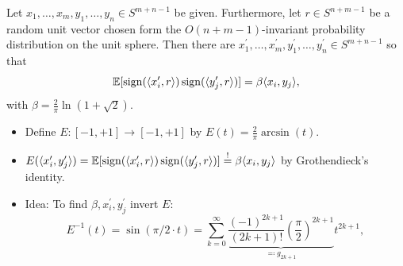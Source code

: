 	\begin{frame}
		\begin{lemma}\label{lem:krivines_trick}
			Let $x_1,\dots,x_m,y_1,\dots,y_n\in S^{m+n-1}$ be given. Furthermore, let $r\in S^{n+m-1}$ be a random unit vector chosen form the $O(n+m-1)$-invariant probability distribution on the unit sphere. Then there are $x_1^\prime,\dots,x_m^\prime, y_1^\prime,\dots,y_n^\prime\in S^{m+n-1}$ so that
			\begin{equation}
				\mathbb{E}[\operatorname{sign}(\langle{x_i^\prime},{r}\rangle)\operatorname{sign}(\langle{y_j^\prime},{r}\rangle)] = \beta \langle{x_i},{y_j}\rangle,
				\label{eq:krivines_trick}
			\end{equation}		
			with $\beta = \frac{2}{\pi} \ln (1+\sqrt{2}).$
		\end{lemma}
		\begin{pbmr}
			\begin{itemize}
				\item<1-> Define $E: [-1,+1] \to [-1,+1]$ by $E(t)=\frac{2}{\pi}\arcsin(t)$.
				\item<2-> $E(\langle{x_i^\prime},{y_j^\prime}\rangle ) = \mathbb{E}[\operatorname{sign}(\langle{x_i^\prime},{r}\rangle)\operatorname{sign}(\langle{y_j^\prime},{r}\rangle)] \overset{!}{=}\beta \langle{x_i},{y_j}\rangle$ by Grothendieck's identity.
				\item<3-> Idea: To find $\beta,x_i^\prime,y_j^\prime$ invert $E$:  
					\[
						E^{-1}(t) = \sin(\pi/2 \cdot t) 
						= \sum_{k=0}^\infty \underbrace{\frac{(-1)^{2k+1}}{(2k+1)!}\left(\frac{\pi}{2}\right)^{2k+1}}_{\eqqcolon g_{2k+1}}  t^{2k+1},
					\]
			\end{itemize}
		\end{pbmr}
	\end{frame}
